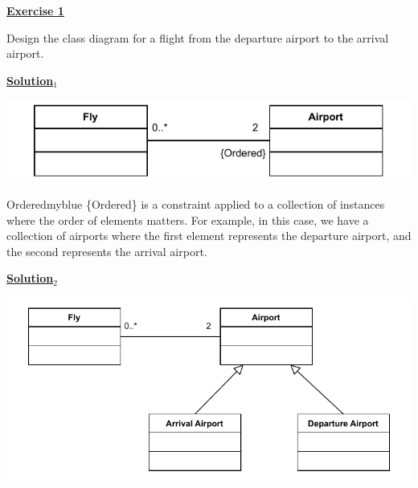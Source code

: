 \begin{center}
    \Huge{\textbf{\underline{Exercise 1}}}
\end{center}

\vspace{0.5cm}

Design the class diagram for a flight from the departure airport to the arrival airport.

\vspace{1cm}

\Large{\textbf{\underline{Solution\(_1\)}}}

\begin{center}
    \includegraphics[height=0.12\textheight]{Exercices/EX1/ex1.1.drawio.pdf}
\end{center}

\vspace{0.5cm}

\begin{prettyBox}{Ordered}{myblue}
\{Ordered\} is a constraint applied to a collection of instances where the order of elements
matters.  
For example, in this case, we have a collection of airports where the first element represents
the departure airport, and the second represents the arrival airport.  
\end{prettyBox}

\vspace{1cm}
\Large{\textbf{\underline{Solution\(_2\)}}}

\begin{center}
    \includegraphics[height=0.3\textheight]{Exercices/EX1/ex1.2.drawio.pdf}
\end{center}

